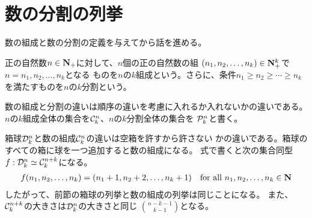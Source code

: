\section{数の分割の列挙}\label{s1:数の分割の列挙} %
	数の組成と数の分割の定義を与えてから話を進める。
	\begin{definition}[数の組成と列挙]\label{def:数の組成と列挙} %
		正の自然数$n\in{\ensuremath{\mathbf{N}}}_+$に対して、$n$個の正の自然数の組
		$(n_1,n_2,\dots,n_k)\in{\ensuremath{\mathbf{N}}}_+^k$で$n=n_1,n_2,\dots,n_k$となる
		ものを$n$の$k$組成という。さらに、条件$n_1\ge n_2\ge\cdots\ge n_k$
		を満たすものを$n$の$k$分割という。
	\end{definition} %
	数の組成と分割の違いは順序の違いを考慮に入れるか入れないかの違いである。
	$n$の$k$組成全体の集合を${\mathcal{C}}_k^n$、$n$の$k$分割全体の集合を
	${\mathcal{P}}_k^n$と書く。

	箱球${\mathcal{D}}_k^n$と数の組成${\mathcal{C}}_k^n$の違いは空箱を許すから許さない
	かの違いである。箱球のすべての箱に球を一つ追加すると数の組成になる。
	式で書くと次の集合同型$f: {\mathcal{D}}_k^n\simeq{\mathcal{C}}_k^{n+k}$になる。
	\begin{equation*}\begin{split} %
		f(n_1,n_2,\dots,n_k) = (n_1+1,n_2+2,\dots,n_k+1)
		\quad\text{for all }n_1,n_2,\dots,n_k\in\sizen
	\end{split}\end{equation*} %
	したがって、前節の箱球の列挙と数の組成の列挙は同じことになる。
	また、${\mathcal{C}}_k^{n+k}$の大きさは${\mathcal{D}}_k^n$の大きさと同じ
	$\binom{n-k-1}{k-1}$となる。

